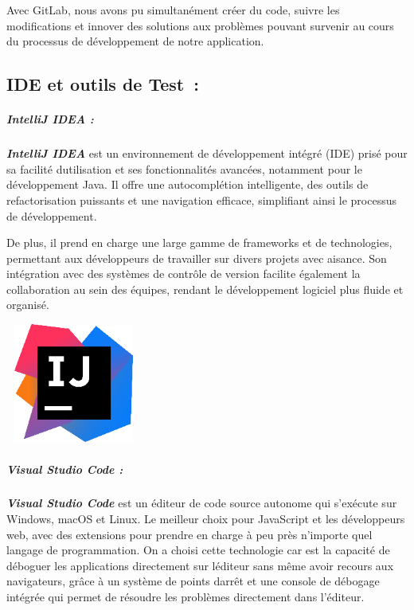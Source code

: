 \documentclass[12pt,a4paper,twoside,openright]{report}
\begin{document}
Avec
GitLab, nous avons pu simultanément créer du code, suivre les
modifications et innover des solutions aux problèmes pouvant survenir au
cours du processus de développement de notre application.

\hypertarget{ide-et-outils-de-test}{%
\subsection{IDE et outils de Test~:}\label{ide-et-outils-de-test}}

\hypertarget{intellij-idea}{%
\subparagraph{IntelliJ IDEA :}\label{intellij-idea}}

\emph{\textbf{IntelliJ IDEA}} est un environnement de développement
intégré (IDE) prisé pour sa facilité d\textquotesingle utilisation et
ses fonctionnalités avancées, notamment pour le développement Java. Il
offre une autocomplétion intelligente, des outils de refactorisation
puissants et une navigation efficace, simplifiant ainsi le processus de
développement.

De plus, il prend en charge une large gamme de frameworks et de
technologies, permettant aux développeurs de travailler sur divers
projets avec aisance. Son intégration avec des systèmes de contrôle de
version facilite également la collaboration au sein des équipes, rendant
le développement logiciel plus fluide et organisé.

\includegraphics[width=1.76111in,height=1.54444in]{latex_media/media/image31.png}

\hypertarget{visual-studio-code}{%
\subparagraph{Visual Studio Code :}\label{visual-studio-code}}

\emph{\textbf{Visual Studio Code}} est un éditeur de code source
autonome qui s'exécute sur Windows, macOS et Linux. Le meilleur choix
pour JavaScript et les développeurs web, avec des extensions pour
prendre en charge à peu près n'importe quel langage de programmation. On
a choisi cette technologie car est la capacité de déboguer les
applications directement sur l\textquotesingle éditeur sans même avoir
recours aux navigateurs, grâce à un système de points
d\textquotesingle arrêt et une console de débogage intégrée qui permet
de résoudre les problèmes directement dans l'éditeur.~
\end{document}
